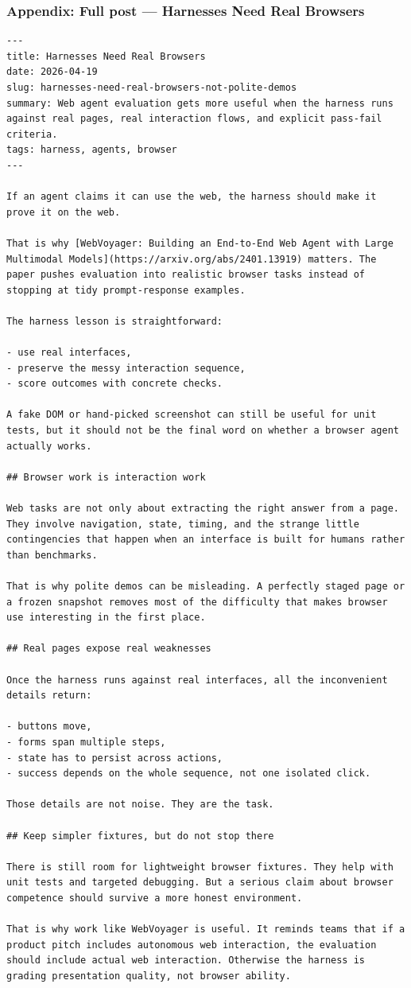 \documentclass[aspectratio=169]{beamer}
\begin{document}
\begin{frame}[fragile]
\frametitle{Appendix: Full post — Harnesses Need Real Browsers}
\begin{verbatim}
---
title: Harnesses Need Real Browsers
date: 2026-04-19
slug: harnesses-need-real-browsers-not-polite-demos
summary: Web agent evaluation gets more useful when the harness runs against real pages, real interaction flows, and explicit pass-fail criteria.
tags: harness, agents, browser
---

If an agent claims it can use the web, the harness should make it prove it on the web.

That is why [WebVoyager: Building an End-to-End Web Agent with Large Multimodal Models](https://arxiv.org/abs/2401.13919) matters. The paper pushes evaluation into realistic browser tasks instead of stopping at tidy prompt-response examples.

The harness lesson is straightforward:

- use real interfaces,
- preserve the messy interaction sequence,
- score outcomes with concrete checks.

A fake DOM or hand-picked screenshot can still be useful for unit tests, but it should not be the final word on whether a browser agent actually works.

## Browser work is interaction work

Web tasks are not only about extracting the right answer from a page. They involve navigation, state, timing, and the strange little contingencies that happen when an interface is built for humans rather than benchmarks.

That is why polite demos can be misleading. A perfectly staged page or a frozen snapshot removes most of the difficulty that makes browser use interesting in the first place.

## Real pages expose real weaknesses

Once the harness runs against real interfaces, all the inconvenient details return:

- buttons move,
- forms span multiple steps,
- state has to persist across actions,
- success depends on the whole sequence, not one isolated click.

Those details are not noise. They are the task.

## Keep simpler fixtures, but do not stop there

There is still room for lightweight browser fixtures. They help with unit tests and targeted debugging. But a serious claim about browser competence should survive a more honest environment.

That is why work like WebVoyager is useful. It reminds teams that if a product pitch includes autonomous web interaction, the evaluation should include actual web interaction. Otherwise the harness is grading presentation quality, not browser ability.
\end{verbatim}
\end{frame}
\end{document}
